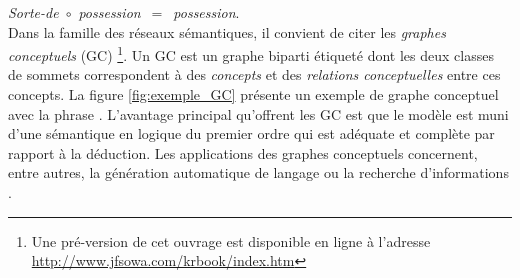 {\emph{Sorte-de}~$\circ$~\emph{possession}~$=$~\emph{possession}. \\







Dans la famille des réseaux sémantiques, il convient de citer les
\emph{graphes conceptuels} (GC) \cite{Sowa1984}
\cite{Sowa2000}\footnote{Une pré-version de cet ouvrage est disponible
  en ligne à l'adresse \url{http://www.jfsowa.com/krbook/index.htm}}.
Un GC est un graphe biparti étiqueté dont les deux classes de sommets
correspondent à des \emph{concepts} et des \emph{relations
  conceptuelles} entre ces concepts.  La figure \ref{fig:exemple_GC}
présente un exemple de graphe conceptuel avec la phrase .  L'avantage principal qu'offrent les GC est
que le modèle est muni d'une sémantique en logique du premier ordre
qui est adéquate et complète par rapport à la déduction.  Les
applications des graphes conceptuels concernent, entre autres, la
génération automatique de langage \cite{Nogier1991} ou la recherche
d'informations \cite{Genest2000}.


}
